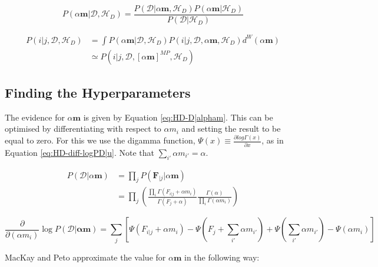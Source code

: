 \begin{equation}
P(\alpha\boldsymbol{m}|\mathcal{D},\mathscr{H}_{D})=\frac{P(\mathcal{D}|\alpha\boldsymbol{m},\mathscr{H}_{D})P(\alpha\boldsymbol{m}|\mathscr{H}_{D})}{P(\mathcal{D}|\mathscr{H}_{D})}
\label{eq:HD-alpham|D-H}
\end{equation}

\begin{align}
P(i|j,\mathcal{D},\mathscr{H}_{D})&=\int P(\alpha\boldsymbol{m}|\mathcal{D},\mathscr{H}_{D})P(i|j,\mathcal{D},\alpha\boldsymbol{m},\mathscr{H}_{D})d^{W}(\alpha\boldsymbol{m}) \nonumber
\\
&\simeq P(i|j,\mathcal{D},[\alpha\boldsymbol{m}]^{MP},\mathscr{H}_{D})
\label{eq:HD-i|j-D-H}
\end{align}

\subsection{Finding the Hyperparameters}

The evidence for $\alpha\boldsymbol{m}$ is given by Equation \ref{eq:HD-D|alpham}. This can be optimised by differentiating with respect to $\alpha m_{i}$ and setting the result to be equal to zero. For this we use the digamma function, $\Psi(x)\equiv\frac{\partial log\Gamma(x)}{\partial x}$, as in Equation \ref{eq:HD-diff-logPD|u}. Note that $\sum_{i'}\alpha m_{i'}=\alpha$.

\begin{align}
P(\mathcal{D}|\alpha\boldsymbol{m})&=\prod_{j}P(\boldsymbol{F}_{|j}|\alpha\boldsymbol{m}) \nonumber
\\
&=\prod_{j}\left(\frac{\prod_{i}\Gamma(F_{i|j}+\alpha m_{i})}{\Gamma(F_{j}+\alpha)}\frac{\Gamma(\alpha)}{\prod_{i}\Gamma(\alpha m_{i})}\right)
\label{eq:HD-D|alpham}
\end{align}

\begin{equation}
\frac{\partial}{\partial (\alpha m_{i})}\log P(\mathcal{D}|\boldsymbol{\alpha\boldsymbol{m}})=\sum_{j}[\Psi(F_{i|j}+\alpha m_{i})-\Psi(F_{j}+\sum_{i'}\alpha m_{i'})+\Psi(\sum_{i'}\alpha m_{i'})-\Psi(\alpha m_{i})] 
\label{eq:HD-diff-logPD|u}
\end{equation}

MacKay and Peto approximate the value for $\alpha\boldsymbol{m}$ in the following way:

